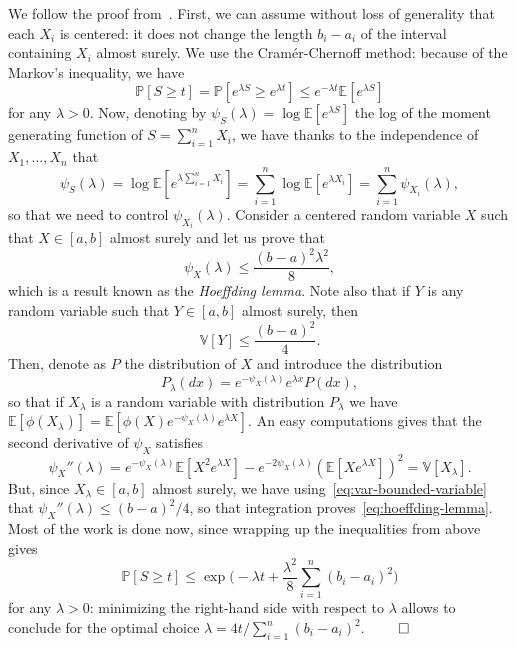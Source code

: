 \documentclass[
	fontsize=11pt, %
	twoside=false, %
	numbers=noenddot, %
]{kaobook}
\renewcommand{\P}{\mathbb P}
\newcommand{\E}{\mathbb E}
\newcommand{\var}{\mathbb V}
\begin{document}
We follow the proof from~\cite{massart2007concentration}.
First, we can assume without loss of generality that each $X_i$ is centered: it does not change the length $b_i - a_i$ of the interval containing $X_i$ almost surely. 
We use the Cram\'er-Chernoff method: because of the Markov's inequality, we have
\begin{equation*}
	\P[S \geq t] = \P[ e^{\lambda S} \geq e^{\lambda t}] \leq e^{-\lambda t} \E [e^{\lambda S}]
\end{equation*}
for any $\lambda  > 0$.
Now, denoting by $\psi_S(\lambda) = \log \E[e^{\lambda S}]$ the log of the moment generating function of $S = \sum_{i=1}^n X_i$, we have thanks to the independence of $X_1, \ldots, X_n$ that
\begin{equation*}
	\psi_S(\lambda) = \log \E[e^{\lambda \sum_{i=1}^n X_i}] = \sum_{i=1}^n \log \E[e^{\lambda X_i}] = \sum_{i=1}^n \psi_{X_i}(\lambda),
\end{equation*}
so that we need to control $\psi_{X_i}(\lambda)$. Consider a centered random variable $X$ such that $X \in [a, b]$ almost surely and let us prove that
\begin{equation}
	\label{eq:hoeffding-lemma}
	\psi_{X}(\lambda) \leq \frac{(b - a)^2 \lambda^2}{8},
\end{equation}
which is a result known as the \emph{Hoeffding lemma}. 
Note also that if $Y$ is any random variable such that $Y \in [a, b]$ almost surely, then%
\sidenote{Just remark that $|Y - (a + b) / 2| \leq (b - a) / 2$ and that $\var[Y] = \var[Y - (a + b) / 2] \leq (b - a)^2 / 4.$}
\begin{equation}
	\label{eq:var-bounded-variable}
	\var[Y] \leq \frac{(b - a)^2}{4}.
\end{equation}
Then, denote as $P$ the distribution of $X$ and introduce the distribution
\begin{equation*}
	P_\lambda(dx) = e^{-\psi_X(\lambda)} e^{\lambda x} P (dx),
\end{equation*}
so that if $X_\lambda$ is a random variable with distribution $P_\lambda$ we have $\E[\phi(X_\lambda)] = \E[\phi(X) e^{-\psi_X(\lambda)} e^{\lambda X}]$.
An easy computations gives that the second derivative of $\psi_X$ satisfies
\begin{equation*}
	\psi_X''(\lambda) = e^{-\psi_X(\lambda)} \E[X^2 e^{\lambda X}] - e^{-2 \psi_X(\lambda)} (\E[X e^{\lambda X}])^2 = \var[X_\lambda].
\end{equation*}
But, since $X_\lambda \in [a, b]$ almost surely, we have using~\eqref{eq:var-bounded-variable} that $\psi_X''(\lambda) \leq (b - a)^2 / 4$, so that integration proves~\eqref{eq:hoeffding-lemma}.%
Most of the work is done now, since wrapping up the inequalities from above gives
\begin{equation*}
	\P[S \geq t] \leq \exp \Big(-\lambda t + \frac{\lambda^2}{8} \sum_{i=1}^n (b_i - a_i)^2 \Big)
\end{equation*}
for any $\lambda > 0$: minimizing the right-hand side with respect to $\lambda$ allows to conclude for the optimal choice $\lambda = 4 t / \sum_{i=1}^n (b_i - a_i)^2$. $\hfill \qed$
\end{document}
